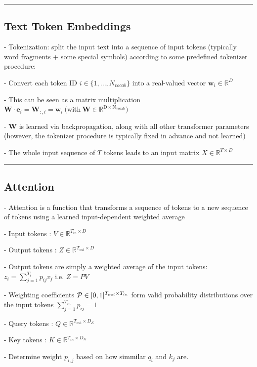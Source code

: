 \vspace{4pt}
\hrule
\vspace{4pt}
\subsection{Text Token Embeddings}

- Tokenization: split the input text into a sequence of input tokens (typically word fragments + some special symbols) according to some predefined tokenizer procedure: 

- Convert each token ID $i\in\{1,...,N_{vocab}\}$ into a real-valued vector $\mathbf{w}_{i}\in\mathbb{R}^{D}$

- This can be seen as a matrix multiplication $\mathbf{W}\cdot\mathbf{e}_{i}=\mathbf{W}_{:,i}=\mathbf{w}_{i}{\mathrm{~(with~\mathbf{W}\in\mathbb{R}^{D \times N_{vocab}}}})$


- $\mathbf{W}$ is learned via backpropagation, along with all other transformer parameters (however, the tokenizer procedure is typically fixed in advance and not learned)

- The whole input sequence of $T$ tokens leads to an input matrix $X\in\mathbb{R}^{T\times D}$

\vspace{4pt}
\hrule
\vspace{4pt}
\subsection{Attention}

- Attention is a function that transforms a sequence of tokens to a new sequence of tokens using a learned input-dependent weighted average

- Input tokens : $V\in\mathbb{R}^{T_{i n}\times D}$

- Output tokens : $Z\in\mathbb{R}^{T_{out}\times D}$

- Output tokens are simply a weighted average of
the input tokens:
$z_{i}=\sum_{j=1}^{T_{i}}p_{i j}v_{j}$ i.e. $Z=P V$

- Weighting coefficients ${\cal P}\in[0,1]^{T_{out}\times T_{i n}}$ form valid probability distributions over the input tokens $\textstyle\sum_{j=1}^{T_{i n}}p_{i j}=1$

- Query tokens : $Q\in\mathbb{R}^{T_{out}\times D_{K}}$

- Key tokens : $K\in\mathbb{R}^{T_{in}\times D_{K}}$

- Determine weight $p_{i,j}$ based on how simmilar $q_i$ and $k_j$ are.

